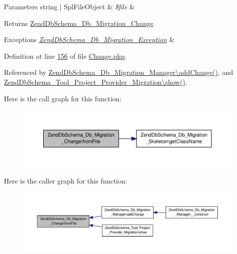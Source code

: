 \begin{DoxyParams}[1]{Parameters}
string | Spl\-File\-Object & {\em \$file} & \\
\hline
\end{DoxyParams}
\begin{DoxyReturn}{Returns}
\hyperlink{classZendDbSchema__Db__Migration__Change}{Zend\-Db\-Schema\-\_\-\-Db\-\_\-\-Migration\-\_\-\-Change} 
\end{DoxyReturn}

\begin{DoxyExceptions}{Exceptions}
{\em \hyperlink{classZendDbSchema__Db__Migration__Exception}{Zend\-Db\-Schema\-\_\-\-Db\-\_\-\-Migration\-\_\-\-Exception}} & \\
\hline
\end{DoxyExceptions}


Definition at line \hyperlink{Change_8php_source_l00156}{156} of file \hyperlink{Change_8php_source}{Change.\-php}.



Referenced by \hyperlink{Manager_8php_source_l00089}{Zend\-Db\-Schema\-\_\-\-Db\-\_\-\-Migration\-\_\-\-Manager\textbackslash{}add\-Change()}, and \hyperlink{Migration_8php_source_l00116}{Zend\-Db\-Schema\-\_\-\-Tool\-\_\-\-Project\-\_\-\-Provider\-\_\-\-Migration\textbackslash{}show()}.



Here is the call graph for this function\-:\nopagebreak
\begin{figure}[H]
\begin{center}
\leavevmode
\includegraphics[width=350pt]{classZendDbSchema__Db__Migration__Change_abd5253380521e63e91099a6ab3b89387_cgraph}
\end{center}
\end{figure}




Here is the caller graph for this function\-:\nopagebreak
\begin{figure}[H]
\begin{center}
\leavevmode
\includegraphics[width=350pt]{classZendDbSchema__Db__Migration__Change_abd5253380521e63e91099a6ab3b89387_icgraph}
\end{center}
\end{figure}



